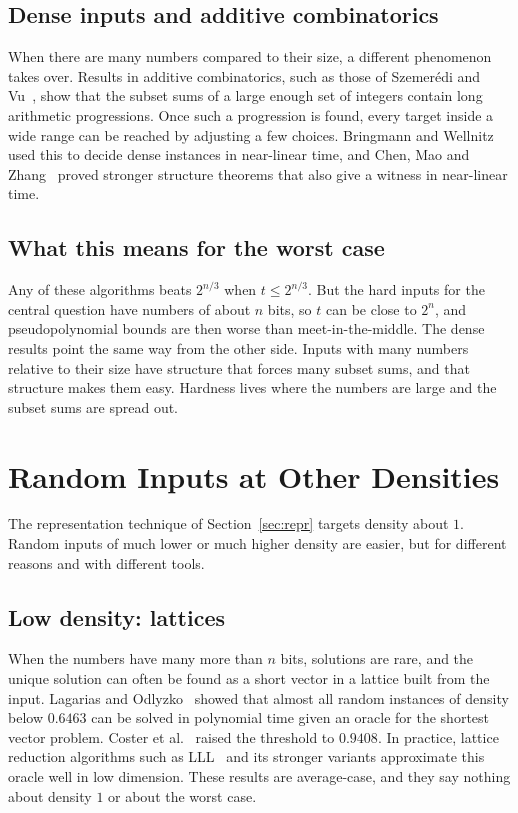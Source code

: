 \documentclass[11pt]{article}
\begin{document}
\subsection{Dense inputs and additive combinatorics}
When there are many numbers compared to their size, a different phenomenon
takes over. Results in additive combinatorics, such as those of
Szemer\'edi and Vu~\cite{sv}, show that the subset sums of a large enough set
of integers contain long arithmetic progressions. Once such a progression is
found, every target inside a wide range can be reached by adjusting a few
choices. Bringmann and Wellnitz~\cite{bw} used this to decide dense instances
in near-linear time, and Chen, Mao and Zhang~\cite{cmz} proved stronger
structure theorems that also give a witness in near-linear time.

\subsection{What this means for the worst case}
Any of these algorithms beats $2^{n/3}$ when $t\le2^{n/3}$. But the hard
inputs for the central question have numbers of about $n$ bits, so $t$ can be
close to $2^n$, and pseudopolynomial bounds are then worse than
meet-in-the-middle. The dense results point the same way from the other side.
Inputs with many numbers relative to their size have structure that forces
many subset sums, and that structure makes them easy. Hardness lives where the
numbers are large and the subset sums are spread out.

\section{Random Inputs at Other Densities}\label{sec:crypto}
The representation technique of Section~\ref{sec:repr} targets density about
$1$. Random inputs of much lower or much higher density are easier, but for
different reasons and with different tools.

\subsection{Low density: lattices}
When the numbers have many more than $n$ bits, solutions are rare, and the
unique solution can often be found as a short vector in a lattice built from
the input. Lagarias and Odlyzko~\cite{lo} showed that almost all random
instances of density below $0.6463$ can be solved in polynomial time given an
oracle for the shortest vector problem. Coster et al.~\cite{cjloss} raised the
threshold to $0.9408$. In practice, lattice reduction algorithms such as
LLL~\cite{lll} and its stronger variants approximate this oracle well in low
dimension. These results are average-case, and they say nothing about density
$1$ or about the worst case.
\end{document}
